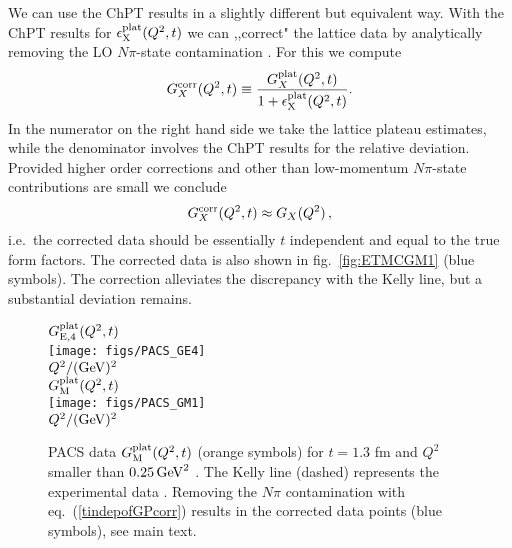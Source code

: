 \documentclass[11pt,prd,aps,showpacs,eqsecnum,floatfix,nofootinbib,preprint,tightenlines]{revtex4}
\newcommand{\pref}[1]{(\ref{#1})}
\begin{document}
We can use the ChPT results in a slightly different but equivalent way. 
With the ChPT results for $\epsilon^{\rm plat}_{\rm X}(Q^2,t)$  we can ,,correct" the lattice data by analytically removing the LO $N\pi$-state contamination \cite{Bar:2018xyi}. For this we compute 
\begin{equation}\label{platestcorrected}
G^{\rm corr}_X(Q^2,t) \equiv \frac{G^{\rm plat}_X(Q^2,t) }{1+ \epsilon^{\rm plat}_{\rm X}(Q^2,t)}.
\end{equation}
In the numerator on the right hand side we take the lattice plateau estimates, while the denominator involves the ChPT results for the relative deviation. Provided higher order corrections and other than low-momentum $N\pi$-state contributions are small we conclude
\begin{equation}\label{tindepofGPcorr}
G^{\rm corr}_X(Q^2,t) \approx G_X(Q^2)\,,
\end{equation}
i.e.\ the corrected data should be essentially $t$ independent and equal to the true form factors. 
The corrected data is also shown in fig.\ \ref{fig:ETMCGM1} (blue symbols). The correction alleviates the discrepancy with the Kelly line, but a substantial deviation remains. 

% 
\begin{figure}[p]
\begin{center}
$G_{\rm E,4}^{\rm plat}(Q^2,t)$\\[0.6ex]
\texttt{[image: figs/PACS\_GE4]}\\[0.6ex]
$Q^2/({\rm GeV})^2$\\[4ex]
$G_{\rm M}^{\rm plat}(Q^2,t)$\\[0.6ex]
\texttt{[image: figs/PACS\_GM1]}\\[0.4ex]
$Q^2/({\rm GeV})^2$\\[0.6ex]
\caption{\label{fig:PACSGM1} PACS data $G^{\rm plat}_{{\rm M}}(Q^2,t)$ (orange symbols) for $t=1.3$ fm and $Q^2$ smaller than $0.25\, {\rm GeV}^2$ \cite{Ishikawa:2018rew}. The Kelly line (dashed) represents the experimental data \cite{Kelly:2004hm}. Removing the $N\pi$ contamination with eq.\ \pref{tindepofGPcorr} results in the corrected data points (blue symbols), see main text.}
\end{center}
\end{figure}
\end{document}
